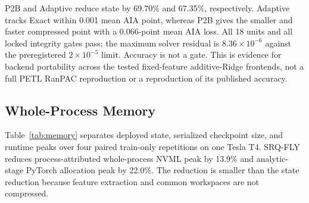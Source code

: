 \documentclass[runningheads]{llncs}
\begin{document}
P2B and Adaptive reduce state by 69.70\% and 67.35\%, respectively. Adaptive
tracks Exact within 0.001 mean AIA point, whereas P2B gives the smaller and
faster compressed point with a 0.066-point mean AIA loss. All 18 units and all
locked integrity gates pass; the maximum solver residual is
$8.36\times10^{-6}$ against the preregistered $2\times10^{-5}$ limit. Accuracy
is not a gate. This is evidence for backend portability across the tested
fixed-feature additive-Ridge frontends, not a full PETL RanPAC reproduction or
a reproduction of its published accuracy.

\subsection{Whole-Process Memory}

Table~\ref{tab:memory} separates deployed state, serialized checkpoint size,
and runtime peaks over four paired train-only repetitions on one Tesla T4.
SRQ-FLY reduces process-attributed whole-process NVML peak by 13.9\% and
analytic-stage PyTorch allocation peak by 22.0\%. The reduction is smaller
than the state reduction because feature extraction and common workspaces are
not compressed.

\begin{table}
\caption{Repeated whole-process CIFAR-100/Tesla T4 measurement. Times are
mean $\pm$ sample standard deviation over four paired repetitions. Memory
plateaus are identical across repetitions.}
\label{tab:memory}
\centering
\small
{}
\end{table}
\end{document}
